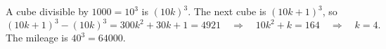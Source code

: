 A cube divisible by $1000=10^3$ is $(10k)^3$. The next cube is $(10k+1)^3$, so
\[(10k+1)^3-(10k)^3=300k^2+30k+1=4921\quad\Longrightarrow\quad 10k^2+k=164\quad\Longrightarrow\quad k=4.\]
The mileage is $40^3=\boxed{64000}$.
